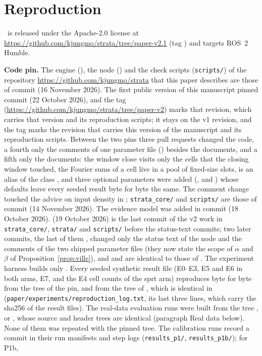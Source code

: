 \section{Reproduction}\label{app:repro}

\sname\ is released under the Apache-2.0 license at \url{https://github.com/kjungmo/strata/tree/paper-v2.1} (tag ) and targets ROS~2 Humble.

\noindent\textbf{Code pin.} The engine (), the node () and the check scripts (\nolinkurl{scripts/}) of the repository \url{https://github.com/kjungmo/strata} that this paper describes are those of commit  (16 November 2026). The first public version of this manuscript pinned commit  (22 October 2026), and the tag  (\url{https://github.com/kjungmo/strata/tree/paper-v2}) marks that revision, which carries that version and its reproduction scripts; it stays on the v1 revision, and the tag  marks the revision that carries this version of the manuscript and its reproduction scripts. Between the two pins three pull requests changed the code, a fourth only the comments of one parameter file () besides the documents, and a fifth only the documents: the window close visits only the cells that the closing window touched, the Fourier sums of a cell live in a pool of fixed-size slots,  is an alias of the class , and three optional parameters were added (,  and ) whose defaults leave every seeded result byte for byte the same. The comment change touched the advice on input density in ; \nolinkurl{strata_core/} and \nolinkurl{scripts/} are those of commit  (14 November 2026). The evidence model  was added in commit  (18 October 2026).  (19 October 2026) is the last commit of the v2 work in \nolinkurl{strata_core/}, \nolinkurl{strata/} and \nolinkurl{scripts/} before the status-text commits; two later commits, the last of them , changed only the status text of the node and the comments of the two shipped parameter files (they now state the scope of $\alpha$ and $\beta$ of Proposition~\ref{prop:ville}), and  and  are identical to those of . The experiment harness builds only . Every seeded synthetic result file (E0--E3, E5 and E6 in both arms, E7, and the E4 cell counts of the sprt arm) reproduces byte for byte from the  tree  of the pin, and from the tree  of , which is identical in  (\nolinkurl{paper/experiments/reproduction_log.txt}, its last three lines, which carry the sha256 of the result files). The real-data evaluation runs were built from the  tree ,  or , whose source and header trees are identical (paragraph Real data below). None of them was repeated with the pinned tree. The calibration runs record a commit in their run manifests and step logs (\nolinkurl{results_p1/}, \nolinkurl{results_p1b/}); for P1b, 